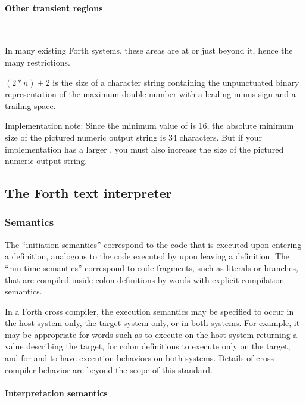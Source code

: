 \setcounter{paragraph}{5}
\paragraph{Other transient regions} ~ %

In many existing Forth systems, these areas are at  or
just beyond it, hence the many restrictions.

$(2*n)+2$ is the size of a character string containing the
unpunctuated binary representation of the maximum double number with
a leading minus sign and a trailing space.

Implementation note: Since the minimum value of  is 16, the
absolute minimum size of the pictured numeric output string is 34
characters. But if your implementation has a larger , you must
also increase the size of the pictured numeric output string.

\subsection{The Forth text interpreter} %

\setcounter{subsubsection}{2}
\subsubsection{Semantics} %

The ``initiation semantics'' correspond to the code that is executed
upon entering a definition, analogous to the code executed by
 upon leaving a definition. The ``run-time semantics''
correspond to code fragments, such as literals or branches, that are
compiled inside colon definitions by words with explicit compilation
semantics.

In a Forth cross compiler, the execution semantics may be specified
to occur in the host system only, the target system only, or in both
systems. For example, it may be appropriate for words such as
 to execute on the host system returning a value describing
the target, for colon definitions to execute only on the target, and
for  and  to have execution behaviors on
both systems. Details of cross compiler behavior are beyond the scope
of this standard.

\setcounter{paragraph}{1}
\paragraph{Interpretation semantics} ~ %
\label{rat:interpret}

